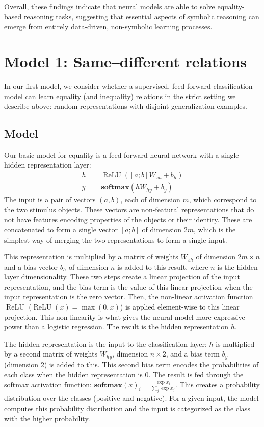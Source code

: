 \documentclass{article}
\newcommand{\softmax}{\mathbf{softmax}}
\DeclareMathOperator{\ReLU}{ReLU}
\begin{document}
Overall, these findings indicate that neural models are able to solve equality-based reasoning tasks, suggesting that essential aspects of symbolic reasoning can emerge from entirely data-driven, non-symbolic learning processes.


\section{Model 1: Same--different relations}\label{sec:equality}

In our first model, we consider whether a supervised, feed-forward classification model can learn equality (and inequality) relations in the strict setting we describe above: random representations with disjoint generalization examples.


\subsection{Model}

Our basic model for equality is a feed-forward neural network with a single hidden representation layer:
%
\begin{align}
  h &= \ReLU([a;b]W_{xh} + b_{h}) \label{eq:x2h}\\
  y &= \softmax(hW_{hy} + b_{y}) \label{eq:h2y}
\end{align}
%
The input is a pair of vectors $(a, b)$, each of dimension $m$, which correspond to the two stimulus objects. These vectors are non-featural representations that do not have features encoding properties of the objects or their identity. These are concatenated to form a single vector $[a;b]$ of dimension $2m$, which is the simplest way of merging the two representations to form a single input.

This representation is multiplied by a matrix of weights $W_{xh}$ of dimension $2m \times n$ and a bias vector $b_{h}$ of dimension $n$ is added to this result, where $n$ is the hidden layer dimensionality. These two steps create a linear projection of the input representation, and the bias term is the value of this linear projection when the input representation is the zero vector. Then, the non-linear activation function $\ReLU$ ($\ReLU(x) = \max(0, x)$) is applied element-wise to this linear projection. This non-linearity is what gives the neural model more expressive power than a logistic regression. The result is the hidden representation $h$.

The hidden representation is the input to the classification layer: $h$ is multiplied by a second matrix of weights $W_{hy}$, dimension $n \times 2$, and a bias term $b_{y}$ (dimension 2) is added to this. This second bias term encodes the probabilities of each class when the hidden representation is 0. The result is fed through the softmax activation function: $\softmax(x)_{i} = \frac{\exp{x_{i}}}{\sum_{j} \exp{x_{j}}}$.  This creates a probability distribution over the classes (positive and negative). For a given input, the model computes this probability distribution and the input is categorized as the class with the higher probability.
\end{document}
